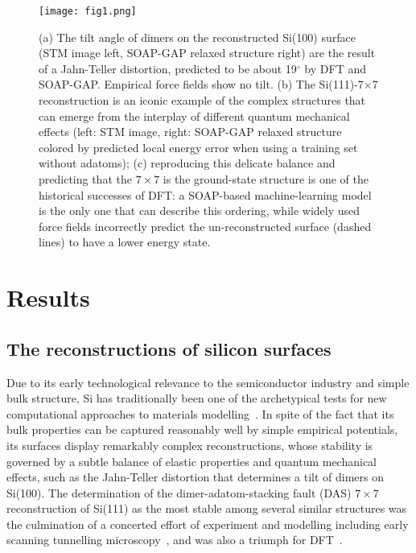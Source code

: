 \documentclass[12pt]{article}
\newcommand{\twocol}{12cm}
\begin{document}
\begin{figure*}[bth]
\centering\texttt{[image: fig1.png]}
\caption{(a) The tilt angle of dimers on the reconstructed Si(100) surface (STM image left\cite{wolk92prl}, SOAP-GAP relaxed structure right) are the result of a Jahn-Teller distortion, predicted to be about 19$^\circ$ by DFT and SOAP-GAP. Empirical force fields show no tilt.
(b) The Si(111)-7$\times$7 
reconstruction
is an iconic example of the complex
structures that can emerge from the
interplay of different quantum mechanical
effects (left: STM image\cite{binn+83prl}, right: SOAP-GAP relaxed structure colored 
by predicted local energy error {when using a training set without adatoms}); (c) reproducing this delicate
balance and predicting that the $7\times 7$ 
is the ground-state structure is one of 
the historical successes of DFT: a 
SOAP-based machine-learning model is the
only one that can describe this ordering, while widely used force fields 
incorrectly predict the un-reconstructed
surface (dashed lines) to have a lower energy state.
}
\label{fig:silicon}
\end{figure*}


\section{Results}

\subsection{The reconstructions of silicon surfaces}

 Due to its early technological relevance to the semiconductor industry and simple bulk structure,
Si has traditionally been one of the archetypical tests for 
new computational approaches to materials modelling~\cite{car-parr85prl,Rinke2009,Williamson2002,behl-parr07prl,behl+08prl,bart+10prl}. In spite of 
the fact that its bulk properties can be captured reasonably
well by simple empirical potentials, its surfaces display
remarkably complex reconstructions, whose stability
is governed by a subtle balance of elastic properties and  quantum mechanical 
effects, such as the Jahn-Teller distortion that determines
a tilt of dimers on Si(100). The determination of the dimer-adatom-stacking fault (DAS) 
$7\times 7$ reconstruction of Si(111) as the most stable 
among several similar structures was the culmination of 
a concerted effort of experiment and modelling
including early scanning tunnelling microscopy~\cite{binn+83prl}, and was also a triumph for DFT~\cite{brom+92prl}. 
\end{document}
